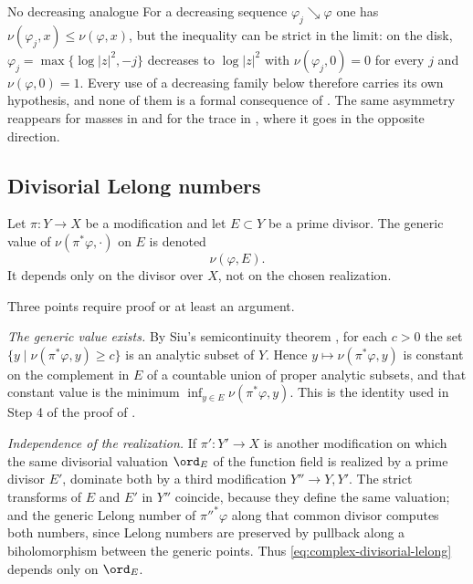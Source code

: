 \begin{warning}{No decreasing analogue}
\label{warn:ch51-lelong-decreasing}
For a decreasing sequence \(\varphi_j\searrow\varphi\) one has
\(\nu(\varphi_j,x)\leq\nu(\varphi,x)\), but the inequality can be strict
in the limit: on the disk, \(\varphi_j=\max\{\log|z|^2,-j\}\) decreases to
\(\log|z|^2\) with \(\nu(\varphi_j,0)=0\) for every \(j\) and
\(\nu(\varphi,0)=1\).  Every use of a decreasing family below therefore
carries its own hypothesis, and none of them is a formal consequence of
.  The same asymmetry reappears for
masses in  and for the trace in
, where it goes in the opposite
direction.
\end{warning}

\subsection{Divisorial Lelong numbers}
\label{sec:ch51-divisorial}

Let \(\pi:Y\to X\) be a modification and let \(E\subset Y\) be a prime
divisor.  The generic value of
\(\nu(\pi^*\varphi,\cdot)\) on \(E\) is denoted
\[
                         \nu(\varphi,E).
\tag{51.8}\label{eq:complex-divisorial-lelong}
\]
It depends only on the divisor over \(X\), not on the chosen realization.

Three points require proof or at least an argument.

\emph{The generic value exists.}  By Siu's semicontinuity theorem
\cite{Siu74}, for each \(c>0\) the set \(\{y\mid\nu(\pi^*\varphi,y)\geq
c\}\) is an analytic subset of \(Y\).  Hence
\(y\mapsto\nu(\pi^*\varphi,y)\) is constant on the complement in \(E\) of
a countable union of proper analytic subsets, and that constant value is
the minimum \(\inf_{y\in E}\nu(\pi^*\varphi,y)\).  This is the identity
used in Step 4 of the proof of .

\emph{Independence of the realization.}  If \(\pi':Y'\to X\) is another
modification on which the same divisorial valuation \(\ord_E\) of the
function field is realized by a prime divisor \(E'\), dominate both by a
third modification \(Y''\to Y,Y'\).  The strict transforms of \(E\) and
\(E'\) in \(Y''\) coincide, because they define the same valuation; and
the generic Lelong number of \(\pi''^*\varphi\) along that common divisor
computes both numbers, since Lelong numbers are preserved by pullback
along a biholomorphism between the generic points.  Thus
\eqref{eq:complex-divisorial-lelong} depends only on \(\ord_E\).

